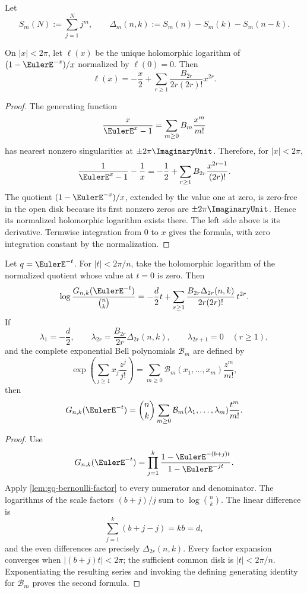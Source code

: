 Let
\[
  S_m(N):=\sum_{j=1}^{N}j^m,
  \qquad
  \Delta_m(n,k):=S_m(n)-S_m(k)-S_m(n-k).
\]

\begin{lemma}
\label{lem:gq-bernoulli-factor}
On \(|x|<2\pi\), let \(\ell(x)\) be the unique holomorphic logarithm of
\((1-\EulerE^{-x})/x\) normalized by \(\ell(0)=0\).  Then
\[
  \ell(x)
  =-\frac{x}{2}
   +\sum_{r\ge1}\frac{B_{2r}}{2r(2r)!}x^{2r}.
\]
\end{lemma}

\begin{proof}
The generating function
\[
  \frac{x}{\EulerE^x-1}
  =\sum_{m\ge0}B_m\frac{x^m}{m!}
\]
has nearest nonzero singularities at \(\pm2\pi\ImaginaryUnit\).  Therefore, for
\(|x|<2\pi\),
\[
  \frac1{\EulerE^x-1}-\frac1x
  =-\frac12+\sum_{r\ge1}B_{2r}\frac{x^{2r-1}}{(2r)!}.
\]
The quotient \((1-\EulerE^{-x})/x\), extended by the value one at zero, is
zero-free in the open disk because its first nonzero zeros are
\(\pm2\pi\ImaginaryUnit\).  Hence its normalized holomorphic logarithm
exists there.  The left side above is its derivative.  Termwise integration
from \(0\) to \(x\) gives the formula, with zero integration constant by the
normalization.
\end{proof}

\begin{theorem}
\label{thm:gq-one-log}
Let \(q=\EulerE^{-t}\).  For \(|t|<2\pi/n\), take the holomorphic logarithm
of the normalized quotient whose value at \(t=0\) is zero.  Then
\[
  \log\frac{G_{n,k}(\EulerE^{-t})}{\binom nk}
  =-\frac d2t
   +\sum_{r\ge1}
    \frac{B_{2r}\Delta_{2r}(n,k)}
         {2r(2r)!}\,t^{2r}.
\]
If
\[
  \lambda_1=-\frac d2,\qquad
  \lambda_{2r}=\frac{B_{2r}}{2r}\Delta_{2r}(n,k),
  \qquad
  \lambda_{2r+1}=0\quad(r\ge1),
\]
and the complete exponential Bell polynomials \(\mathcal B_m\) are defined by
\[
  \exp\left(\sum_{j\ge1}x_j\frac{z^j}{j!}\right)
  =\sum_{m\ge0}\mathcal B_m(x_1,\ldots,x_m)\frac{z^m}{m!},
\]
then
\[
  G_{n,k}(\EulerE^{-t})
  =\binom nk\sum_{m\ge0}
    \mathcal B_m(\lambda_1,\ldots,\lambda_m)\frac{t^m}{m!}.
\]
\end{theorem}

\begin{proof}
Use
\[
  G_{n,k}(\EulerE^{-t})
  =\prod_{j=1}^{k}
    \frac{1-\EulerE^{-(b+j)t}}{1-\EulerE^{-jt}}.
\]
Apply \cref{lem:gq-bernoulli-factor} to every numerator and denominator.
The logarithms of the scale factors \((b+j)/j\) sum to
\(\log\binom nk\).  The linear difference is
\[
  \sum_{j=1}^{k}(b+j-j)=kb=d,
\]
and the even differences are precisely
\(\Delta_{2r}(n,k)\).  Every factor expansion converges when
\(|(b+j)t|<2\pi\); the sufficient common disk is \(|t|<2\pi/n\).
Exponentiating the resulting series and invoking the defining generating
identity for \(\mathcal B_m\) proves the second formula.
\end{proof}

